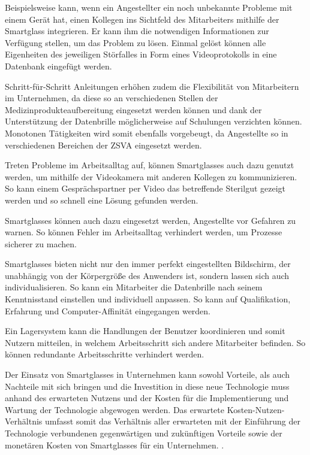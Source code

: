 Beispielsweise kann, wenn ein Angestellter ein noch unbekannte Probleme mit einem Gerät hat, einen Kollegen ins Sichtfeld des Mitarbeiters mithilfe der Smartglass integrieren. Er kann ihm die notwendigen Informationen zur Verfügung stellen, um das Problem zu lösen. Einmal gelöst können alle Eigenheiten des jeweiligen Störfalles in Form eines Videoprotokolls in eine Datenbank eingefügt werden.

Schritt-für-Schritt Anleitungen erhöhen zudem die Flexibilität von Mitarbeitern im Unternehmen, da diese so an verschiedenen Stellen der Medizinprodukteaufbereitung eingesetzt werden können und dank der Unterstützung der Datenbrille möglicherweise auf Schulungen verzichten können. Monotonen Tätigkeiten wird somit ebenfalls vorgebeugt, da Angestellte so in verschiedenen Bereichen der ZSVA eingesetzt werden.

Treten Probleme im Arbeitsalltag auf, können Smartglasses auch dazu genutzt werden, um mithilfe der Videokamera mit anderen Kollegen zu kommunizieren. So kann einem Gesprächspartner per Video das betreffende Sterilgut gezeigt werden und so schnell eine Lösung gefunden werden.

Smartglasses können auch dazu eingesetzt werden, Angestellte vor Gefahren zu warnen. So können Fehler im Arbeitsalltag verhindert werden, um Prozesse sicherer zu machen.

Smartglasses bieten nicht nur den immer perfekt eingestellten Bildschirm, der unabhängig von der Körpergröße des Anwenders ist, sondern lassen sich auch individualisieren. So kann ein Mitarbeiter die Datenbrille nach seinem Kenntnisstand einstellen und individuell anpassen. So kann auf Qualifikation, Erfahrung und Computer-Affinität eingegangen werden.

Ein Lagersystem kann die Handlungen der Benutzer koordinieren und somit Nutzern mitteilen, in welchem Arbeitsschritt sich andere Mitarbeiter befinden. So können redundante Arbeitsschritte verhindert werden. 

Der Einsatz von Smartglasses in Unternehmen kann sowohl Vorteile, als auch Nachteile mit sich bringen und die Investition in diese neue Technologie muss anhand des erwarteten Nutzens und der Kosten für die Implementierung und Wartung der Technologie abgewogen werden. Das erwartete Kosten-Nutzen-Verhältnis umfasst somit das Verhältnis aller erwarteten mit der Einführung der Technologie verbundenen gegenwärtigen und zukünftigen Vorteile sowie der monetären Kosten von Smartglasses für ein Unternehmen. \cite{Hein2016}. 

